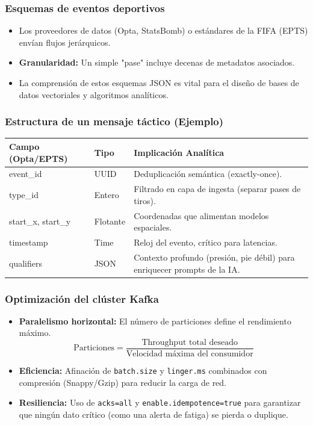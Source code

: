 \documentclass[aspectratio=169]{beamer}
\begin{document}
\begin{frame}\frametitle{Esquemas de eventos deportivos}
\begin{itemize}
    \item Los proveedores de datos (Opta, StatsBomb) o estándares de la FIFA (EPTS) envían flujos jerárquicos.
    \item \textbf{Granularidad:} Un simple "pase" incluye decenas de metadatos asociados.
    \item La comprensión de estos esquemas JSON es vital para el diseño de bases de datos vectoriales y algoritmos analíticos.
\end{itemize}
\end{frame}

\begin{frame}\frametitle{Estructura de un mensaje táctico (Ejemplo)}
\begin{center}
\small
\begin{tabular}{l l >{\raggedright\arraybackslash}p{7.6cm}}
\hline
\textbf{Campo (Opta/EPTS)} & \textbf{Tipo} & \textbf{Implicación Analítica} \\
\hline
event\_id & UUID & Deduplicación semántica (exactly-once). \\
type\_id & Entero & Filtrado en capa de ingesta (separar pases de tiros). \\
start\_x, start\_y & Flotante & Coordenadas que alimentan modelos espaciales. \\
timestamp & Time & Reloj del evento, crítico para latencias. \\
qualifiers & JSON & Contexto profundo (presión, pie débil) para enriquecer prompts de la IA. \\
\hline
\end{tabular}
\end{center}
\end{frame}

\begin{frame}\frametitle{Optimización del clúster Kafka}
\begin{itemize}
    \item \textbf{Paralelismo horizontal:} El número de particiones define el rendimiento máximo.
    \[
    \text{Particiones} = \frac{\text{Throughput total deseado}}{\text{Velocidad máxima del consumidor}}
    \]
    \item \textbf{Eficiencia:} Afinación de \texttt{batch.size} y \texttt{linger.ms} combinados con compresión (Snappy/Gzip) para reducir la carga de red.
    \item \textbf{Resiliencia:} Uso de \texttt{acks=all} y \texttt{enable.idempotence=true} para garantizar que ningún dato crítico (como una alerta de fatiga) se pierda o duplique.
\end{itemize}
\end{frame}
\end{document}
